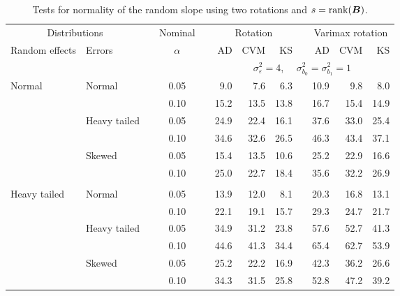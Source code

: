 

\begin{table}[ht]
\caption{\label{tab:simb1sB-alt}Tests for normality of the random slope using two rotations and $s = \operatorname{rank}(\bm{B})$.}
\begin{scriptsize}
\begin{center}
\begin{tabular}{ll p{.1cm} c p{.1cm} rrr p{.1cm} rrr}
  \hline
  \multicolumn{2}{c}{Distributions}& & Nominal & &  \multicolumn{3}{c}{Rotation} & & \multicolumn{3}{c}{Varimax rotation} \\ \cline{1-2} \cline{6-8} \cline{10-12}   
  Random effects & Errors & & $\alpha$ & & AD & CVM & KS & & AD & CVM & KS \\ 
   \hline
& && && \multicolumn{7}{c}{$\sigma_{\varepsilon}^2 = 4$, \ \ $\sigma_{b_0}^2 = \sigma_{b_1}^2 = 1$} \\ \cline{6-12}
\rowcolor{gray!20}Normal       & Normal       && 0.05 &&   9.0 & 7.6 & 6.3 &   & 10.9 & 9.8 & 8.0 \\ 
\rowcolor{gray!20}             &              && 0.10 &&   15.2 & 13.5 & 13.8 &   & 16.7 & 15.4 & 14.9 \\ 
\rowcolor{gray!20}             & Heavy tailed && 0.05 &&   24.9 & 22.4 & 16.1 &   & 37.6 & 33.0 & 25.4 \\ 
\rowcolor{gray!20}             &              && 0.10 &&   34.6 & 32.6 & 26.5 &   & 46.3 & 43.4 & 37.1 \\ 
\rowcolor{gray!20}             & Skewed       && 0.05 &&   15.4 & 13.5 & 10.6 &   & 25.2 & 22.9 & 16.6 \\ 
\rowcolor{gray!20}             &              && 0.10 &&   25.0 & 22.7 & 18.4 &   & 35.6 & 32.2 & 26.9 \\ 
&&&&&&&&&&&\\
Heavy tailed & Normal       && 0.05 &&   13.9 & 12.0 & 8.1 &   & 20.3 & 16.8 & 13.1 \\ 
             &              && 0.10 &&   22.1 & 19.1 & 15.7 &   & 29.3 & 24.7 & 21.7 \\ 
             & Heavy tailed && 0.05 &&   34.9 & 31.2 & 23.8 &   & 57.6 & 52.7 & 41.3 \\ 
             &              && 0.10 &&   44.6 & 41.3 & 34.4 &   & 65.4 & 62.7 & 53.9 \\ 
             & Skewed       && 0.05 &&   25.2 & 22.2 & 16.9 &   & 42.3 & 36.2 & 26.6 \\ 
             &              && 0.10 &&   34.3 & 31.5 & 25.8 &   & 52.8 & 47.2 & 39.2 \\ 

\end{tabular}
\end{center}
\end{scriptsize}
\end{table}
